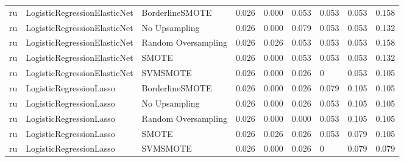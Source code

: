 \begin{tabular}{lllllllll}
      ru &    LogisticRegressionElasticNet &               BorderlineSMOTE &     0.026 &                     0.000 &                 0.053 &                  0.053 &                                   0.053 &     0.158 \\
      ru &    LogisticRegressionElasticNet &                 No Upsampling &     0.026 &                     0.000 &                 0.079 &                  0.053 &                                   0.053 &     0.132 \\
      ru &    LogisticRegressionElasticNet &           Random Oversampling &     0.026 &                     0.026 &                 0.053 &                  0.053 &                                   0.053 &     0.158 \\
      ru &    LogisticRegressionElasticNet &                         SMOTE &     0.026 &                     0.000 &                 0.053 &                  0.053 &                                   0.053 &     0.132 \\
      ru &    LogisticRegressionElasticNet &                      SVMSMOTE &     0.026 &                     0.000 &                 0.026 &                      0 &                                   0.053 &     0.105 \\
      ru &         LogisticRegressionLasso &               BorderlineSMOTE &     0.026 &                     0.000 &                 0.026 &                  0.079 &                                   0.105 &     0.105 \\
      ru &         LogisticRegressionLasso &                 No Upsampling &     0.026 &                     0.000 &                 0.026 &                  0.053 &                                   0.105 &     0.105 \\
      ru &         LogisticRegressionLasso &           Random Oversampling &     0.026 &                     0.000 &                 0.000 &                  0.053 &                                   0.105 &     0.105 \\
      ru &         LogisticRegressionLasso &                         SMOTE &     0.026 &                     0.026 &                 0.026 &                  0.053 &                                   0.079 &     0.105 \\
      ru &         LogisticRegressionLasso &                      SVMSMOTE &     0.026 &                     0.000 &                 0.026 &                      0 &                                   0.079 &     0.079 \\

\end{tabular}

